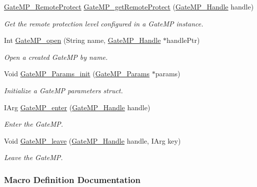 \begin{DoxyCompactItemize}
\hyperlink{_gate_m_p_8h_a88716d5706d8fa8c6a3b9a4f023ef1d8}{Gate\-M\-P\-\_\-\-Remote\-Protect} \hyperlink{_gate_m_p_8h_a6b36fa302c1dfa45c85806990c99774a}{Gate\-M\-P\-\_\-get\-Remote\-Protect} (\hyperlink{_gate_m_p_8h_ad5bb259f928a14e98d973334bc60ebb3}{Gate\-M\-P\-\_\-\-Handle} handle)
\begin{DoxyCompactList}\small\item\em Get the remote protection level configured in a Gate\-M\-P instance. \end{DoxyCompactList}\item 
Int \hyperlink{_gate_m_p_8h_acefd091d723ca21a0a02e1e1d5600fc8}{Gate\-M\-P\-\_\-open} (String name, \hyperlink{_gate_m_p_8h_ad5bb259f928a14e98d973334bc60ebb3}{Gate\-M\-P\-\_\-\-Handle} $\ast$handle\-Ptr)
\begin{DoxyCompactList}\small\item\em Open a created Gate\-M\-P by name. \end{DoxyCompactList}\item 
Void \hyperlink{_gate_m_p_8h_aa9ed943f88964311c2447777c3b330f4}{Gate\-M\-P\-\_\-\-Params\-\_\-init} (\hyperlink{struct_gate_m_p___params}{Gate\-M\-P\-\_\-\-Params} $\ast$params)
\begin{DoxyCompactList}\small\item\em Initialize a Gate\-M\-P parameters struct. \end{DoxyCompactList}\item 
I\-Arg \hyperlink{_gate_m_p_8h_a20a6cab18407f07cb1dbcba48de04cd3}{Gate\-M\-P\-\_\-enter} (\hyperlink{_gate_m_p_8h_ad5bb259f928a14e98d973334bc60ebb3}{Gate\-M\-P\-\_\-\-Handle} handle)
\begin{DoxyCompactList}\small\item\em Enter the Gate\-M\-P. \end{DoxyCompactList}\item 
Void \hyperlink{_gate_m_p_8h_a622c40958deebda445715cd8e8b3ea34}{Gate\-M\-P\-\_\-leave} (\hyperlink{_gate_m_p_8h_ad5bb259f928a14e98d973334bc60ebb3}{Gate\-M\-P\-\_\-\-Handle} handle, I\-Arg key)
\begin{DoxyCompactList}\small\item\em Leave the Gate\-M\-P. \end{DoxyCompactList}\end{DoxyCompactItemize}


\subsubsection{Macro Definition Documentation}
